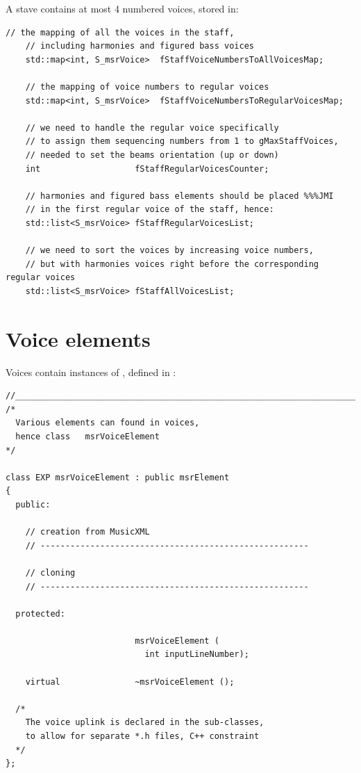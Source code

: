 A stave contains at most 4 numbered voices, stored in:
\begin{lstlisting}[language=CPlusPlus]
    // the mapping of all the voices in the staff,
    // including harmonies and figured bass voices
    std::map<int, S_msrVoice>  fStaffVoiceNumbersToAllVoicesMap;

    // the mapping of voice numbers to regular voices
    std::map<int, S_msrVoice>  fStaffVoiceNumbersToRegularVoicesMap;

    // we need to handle the regular voice specifically
    // to assign them sequencing numbers from 1 to gMaxStaffVoices,
    // needed to set the beams orientation (up or down)
    int                   fStaffRegularVoicesCounter;

    // harmonies and figured bass elements should be placed %%%JMI
    // in the first regular voice of the staff, hence:
    std::list<S_msrVoice> fStaffRegularVoicesList;

    // we need to sort the voices by increasing voice numbers,
    // but with harmonies voices right before the corresponding regular voices
    std::list<S_msrVoice> fStaffAllVoicesList;
\end{lstlisting}


\section{Voice elements}\label{Voice elements}

Voices contain instances of , defined in :
\begin{lstlisting}[language=CPlusPlus]
//______________________________________________________________________________
/*
  Various elements can found in voices,
  hence class   msrVoiceElement
*/

class EXP msrVoiceElement : public msrElement
{
  public:

    // creation from MusicXML
    // ------------------------------------------------------

    // cloning
    // ------------------------------------------------------

  protected:

                          msrVoiceElement (
                            int inputLineNumber);

    virtual               ~msrVoiceElement ();

  /*
    The voice uplink is declared in the sub-classes,
    to allow for separate *.h files, C++ constraint
  */
};
\end{lstlisting}

